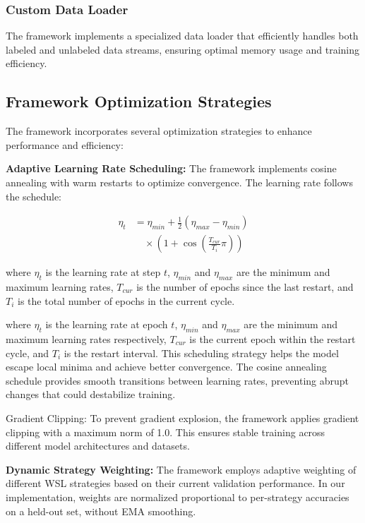 \documentclass{ieeeaccess}
\begin{document}
\subsubsection{Custom Data Loader}
The framework implements a specialized data loader that efficiently handles both labeled and unlabeled data streams, ensuring optimal memory usage and training efficiency.



\subsection{Framework Optimization Strategies}
The framework incorporates several optimization strategies to enhance performance and efficiency:

\textbf{Adaptive Learning Rate Scheduling:} The framework implements cosine annealing with warm restarts to optimize convergence. The learning rate follows the schedule:

\begin{align}
\eta_t &= \eta_{min} + \frac{1}{2}(\eta_{max} - \eta_{min}) \nonumber \\
&\quad \times \left(1 + \cos\left(\frac{T_{cur}}{T_i}\pi\right)\right)
\label{eq:cosine_annealing}
\end{align}

where $\eta_t$ is the learning rate at step $t$, $\eta_{min}$ and $\eta_{max}$ are the minimum and maximum learning rates, $T_{cur}$ is the number of epochs since the last restart, and $T_i$ is the total number of epochs in the current cycle.



where $\eta_t$ is the learning rate at epoch $t$, $\eta_{min}$ and $\eta_{max}$ are the minimum and maximum learning rates respectively, $T_{cur}$ is the current epoch within the restart cycle, and $T_i$ is the restart interval. This scheduling strategy helps the model escape local minima and achieve better convergence. The cosine annealing schedule provides smooth transitions between learning rates, preventing abrupt changes that could destabilize training.

Gradient Clipping: To prevent gradient explosion, the framework applies gradient clipping with a maximum norm of 1.0. This ensures stable training across different model architectures and datasets.

\textbf{Dynamic Strategy Weighting:} The framework employs adaptive weighting of different WSL strategies based on their current validation performance. In our implementation, weights are normalized proportional to per-strategy accuracies on a held-out set, without EMA smoothing.
\end{document}
